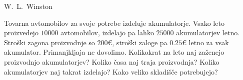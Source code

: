 \begin{naloga}{W.~L.~Winston}{\cite[\S15, Example~5]{w}}
\begin{vprasanje}
Tovarna avtomobilov za svoje potrebe izdeluje akumulatorje.
Vsako leto proizvedejo $10000$ avtomobilov,
izdelajo pa lahko $25000$ akumulatorjev letno.
Stroški zagona proizvodnje so $200 €$,
stroški zaloge pa $0.25 €$ letno za vsak akumulator.
Primanjkljaja ne dovolimo.
Kolikokrat na leto naj zaženejo proizvodnjo akumulatorjev?
Koliko časa naj traja proizvodnja?
Koliko akumulatorjev naj takrat izdelajo?
Kako veliko skladišče potrebujejo?
\end{vprasanje}
\begin{odgovor}
\end{odgovor}
\end{naloga}
